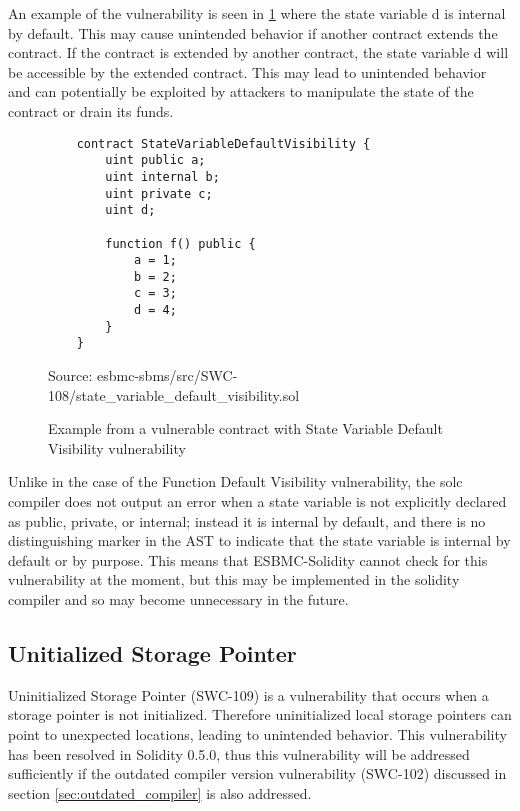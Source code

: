 An example of the vulnerability is seen in \ref{fig:state_variable_default_visibility} where the state variable d is internal by default. This may cause unintended behavior if another contract extends the contract. If the contract is extended by another contract, the state variable d will be accessible by the extended contract. This may lead to unintended behavior and can potentially be exploited by attackers to manipulate the state of the contract or drain its funds.

\begin{figure}
\begin{lstlisting}
    contract StateVariableDefaultVisibility {
        uint public a;
        uint internal b;
        uint private c;
        uint d;
    
        function f() public {
            a = 1;
            b = 2;
            c = 3;
            d = 4;
        }
    }
\end{lstlisting}
\caption{Example from a vulnerable contract with State Variable Default Visibility vulnerability }
Source: esbmc-sbms/src/SWC-108/state\_variable\_default\_visibility.sol
\label{fig:state_variable_default_visibility}
\end{figure}

Unlike in the case of the Function Default Visibility vulnerability, the solc compiler does not output an error when a state variable is not explicitly declared as public, private, or internal; instead it is internal by default, and there is no distinguishing marker in the AST to indicate that the state variable is internal by default or by purpose. This means that ESBMC-Solidity cannot check for this vulnerability at the moment, but this may be implemented in the solidity compiler and so may become unnecessary in the future.

\subsection{Unitialized Storage Pointer}
\label{sec:uninitialized_storage_pointer}

Uninitialized Storage Pointer (SWC-109) is a vulnerability that occurs when a storage pointer is not initialized. Therefore uninitialized local storage pointers can point to unexpected locations, leading to unintended behavior. This vulnerability has been resolved in Solidity 0.5.0, thus this vulnerability will be addressed sufficiently if the outdated compiler version vulnerability (SWC-102) discussed in section \ref{sec:outdated_compiler} is also addressed.

